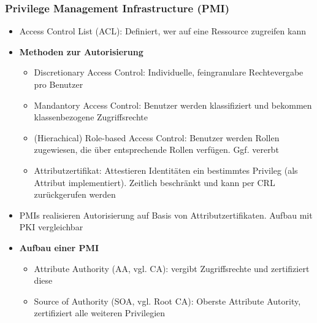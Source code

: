 \subsubsection{Privilege Management Infrastructure (PMI)}
\begin{itemize}
	\item Access Control List (ACL): Definiert, wer auf eine Ressource zugreifen kann
	\item \textbf{Methoden zur Autorisierung}
	\begin{itemize}
		\item Discretionary Access Control: Individuelle, feingranulare Rechtevergabe pro Benutzer
		\item Mandantory Access Control: Benutzer werden klassifiziert und bekommen klassenbezogene Zugriffsrechte
		\item (Hierachical) Role-based Access Control: Benutzer werden Rollen zugewiesen, die über entsprechende Rollen verfügen. Ggf. vererbt
		\item Attributzertifikat: Attestieren Identitäten ein bestimmtes Privileg (als Attribut implementiert). Zeitlich beschränkt und kann per CRL zurückgerufen werden
	\end{itemize}
	\item PMIs realisieren Autorisierung auf Basis von Attributzertifikaten. Aufbau mit PKI vergleichbar
	\item \textbf{Aufbau einer PMI}
	\begin{itemize}
		\item Attribute Authority (AA, vgl. CA): vergibt Zugriffsrechte und zertifiziert diese
		\item Source of Authority (SOA, vgl. Root CA): Oberste Attribute Autority, zertifiziert alle weiteren Privilegien
	\end{itemize}
\end{itemize}


